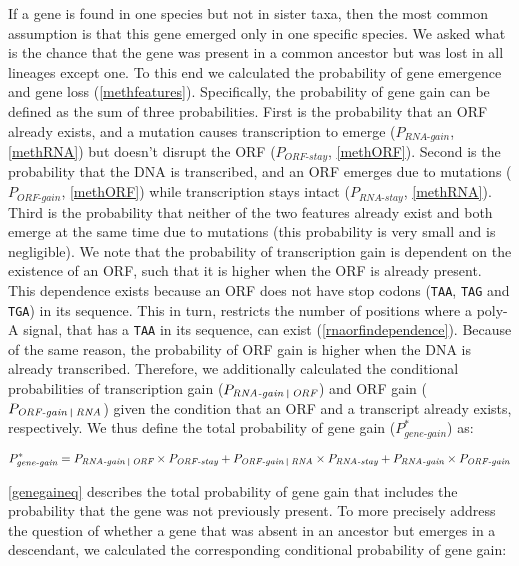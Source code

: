 \documentclass[12pt,a4paper]{article}
\begin{document}
If a gene is found in one species but not in sister taxa, then the most common assumption is that this gene emerged only in one specific species. We asked what is the chance that the gene was present in a common ancestor but was lost in all lineages except one. To this end we calculated the probability of gene emergence and gene loss (\autoref{methfeatures}). Specifically, the probability of gene gain can be defined as the sum of three probabilities. First is the probability that an ORF already exists, and a mutation causes transcription to emerge ($P_\textit{RNA-gain}$, \autoref{methRNA}) but doesn't disrupt the ORF ($P_\textit{ORF-stay}$, \autoref{methORF}). Second is the probability that the DNA is transcribed, and an ORF emerges due to mutations ($P_\textit{ORF-gain}$, \autoref{methORF}) while transcription stays intact ($P_\textit{RNA-stay}$, \autoref{methRNA}). Third is the probability that neither of the two features already exist and both emerge at the same time due to mutations (this probability is very small and is negligible). We note that the probability of transcription gain is dependent on the existence of an ORF, such that it is higher when the ORF is already present. This dependence exists because an ORF does not have stop codons (\texttt{TAA}, \texttt{TAG} and \texttt{TGA}) in its sequence. This in turn, restricts the number of positions where a poly-A signal, that has a \texttt{TAA} in its sequence, can exist (\autoref{rnaorfindependence}). Because of the same reason, the probability of ORF gain is higher when the DNA is already transcribed. Therefore, we additionally calculated the conditional probabilities of transcription gain ($P_\textit{RNA-gain \vline\ ORF}$) and ORF gain ($P_\textit{ORF-gain \vline\ RNA}$) given the condition that an ORF and a transcript already exists, respectively. We thus define the total probability of gene gain ($P_\textit{gene-gain}^*$) as:

\begin{equation}
P_\textit{gene-gain}^* = P_\textit{RNA-gain \vline\ ORF} \times P_\textit{ORF-stay} + P_\textit{ORF-gain \vline\ RNA} \times P_\textit{RNA-stay} + P_\textit{RNA-gain}\times P_\textit{ORF-gain}
\label{genegaineq}
\end{equation}

\autoref{genegaineq} describes the total probability of gene gain that includes the probability that the gene was not previously present. To more precisely address the question of whether a gene that was absent in an ancestor but emerges in a descendant, we calculated the corresponding conditional probability of gene gain:
\end{document}
